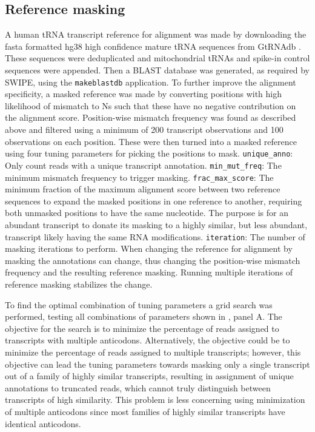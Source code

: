\documentclass[9pt,lineno]{elife}
\begin{document}
\subsection{Reference masking}
A human tRNA transcript reference for alignment was made by downloading the fasta formatted hg38 high confidence mature tRNA sequences from GtRNAdb \citep{Chan2016-wt}.
These sequences were deduplicated and mitochondrial tRNAs and spike-in control sequences were appended.
Then a BLAST database was generated, as required by SWIPE, using the \texttt{makeblastdb} application.
To further improve the alignment specificity, a masked reference was made by converting positions with high likelihood of mismatch to Ns such that these have no negative contribution on the alignment score.
Position-wise mismatch frequency was found as described above and filtered using a minimum of 200 transcript observations and 100 observations on each position.
These were then turned into a masked reference using four tuning parameters for picking the positions to mask.
\verb|unique_anno|: Only count reads with a unique transcript annotation.
\verb|min_mut_freq|: The minimum mismatch frequency to trigger masking.
\verb|frac_max_score|: The minimum fraction of the maximum alignment score between two reference sequences to expand the masked positions in one reference to another, requiring both unmasked positions to have the same nucleotide.
The purpose is for an abundant transcript to donate its masking to a highly similar, but less abundant, transcript likely having the same RNA modifications.
\verb|iteration|: The number of masking iterations to perform.
When changing the reference for alignment by masking the annotations can change, thus changing the position-wise mismatch frequency and the resulting reference masking.
Running multiple iterations of reference masking stabilizes the change.

To find the optimal combination of tuning parameters a grid search was performed, testing all combinations of parameters shown in , panel A.
The objective for the search is to minimize the percentage of reads assigned to transcripts with multiple anticodons.
Alternatively, the objective could be to minimize the percentage of reads assigned to multiple transcripts; however, this objective can lead the tuning parameters towards masking only a single transcript out of a family of highly similar transcripts, resulting in assignment of unique annotations to truncated reads, which cannot truly distinguish between transcripts of high similarity.
This problem is less concerning using minimization of multiple anticodons since most families of highly similar transcripts have identical anticodons.
\end{document}
